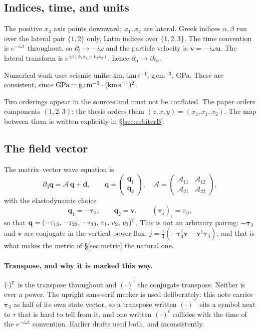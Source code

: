 \documentclass[11pt,a4paper]{article}
\newcommand{\bq}{\mathbf{q}}
\newcommand{\bd}{\mathbf{d}}
\newcommand{\bv}{\mathbf{v}}
\newcommand{\bu}{\mathbf{u}}
\newcommand{\bta}{\boldsymbol{\tau}}
\newcommand{\Aop}{\mathcal{A}}
\newcommand{\tp}{^{\mkern-1.5mu\mathsf{T}}}
\begin{document}
\subsection{Indices, time, and units}

The positive $x_3$ axis points downward; $x_1,x_2$ are lateral.  Greek indices
$\alpha,\beta$ run over the lateral pair $\{1,2\}$ only, Latin indices over
$\{1,2,3\}$.  The time convention is $e^{-i\omega t}$ throughout, so
$\partial_t \to -i\omega$ and the particle velocity is $\bv = -i\omega\bu$.  The
lateral transform is $e^{+i(k_1x_1+k_2x_2)}$, hence $\partial_\alpha \to
ik_\alpha$.

Numerical work uses seismic units: km, km\,s$^{-1}$, g\,cm$^{-3}$, GPa.  These
are consistent, since $\text{GPa} = \text{g\,cm}^{-3}\cdot(\text{km\,s}^{-1})^2$.

Two orderings appear in the sources and must not be conflated.  The paper orders
components $(1,2,3)$; the thesis orders them $(z,x,y) = (x_3,x_1,x_2)$.  The map
between them is written explicitly in \S\ref{sec:arbiterB}.

\subsection{The field vector}

The matrix--vector wave equation is
\begin{equation}\label{eq:mvwe}
  \partial_3\bq = \Aop\,\bq + \bd,
  \qquad
  \bq = \begin{pmatrix}\bq_1\\ \bq_2\end{pmatrix},
  \quad
  \Aop = \begin{pmatrix}\Aop_{11} & \Aop_{12}\\ \Aop_{21} & \Aop_{22}\end{pmatrix},
\end{equation}
with the elastodynamic choice
\begin{equation}\label{eq:qdef}
  \bq_1 = -\bta_3, \qquad \bq_2 = \bv,
  \qquad (\bta_j)_i = \tau_{ij},
\end{equation}
so that $\bq = (-\tau_{13},\,-\tau_{23},\,-\tau_{33},\,v_1,\,v_2,\,v_3)\tp$.
This is not an arbitrary pairing: $-\bta_3$ and $\bv$ are conjugate in the
vertical power flux, $j = \tfrac14(-\bta_3^{\dagger}\bv - \bv^{\dagger}\bta_3)$,
and that is what makes the metric of \S\ref{sec:metric} the natural one.

\paragraph{Transpose, and why it is marked this way.}  $(\cdot)\tp$ is the
transpose throughout and $(\cdot)^{\dagger}$ the conjugate transpose.  Neither
is ever a power.  The upright sans-serif marker is used deliberately: this note
carries $\bta_3$ as half of its own state vector, so a transpose written
$(\cdot)^{\top}$ sits a symbol next to $\tau$ that is hard to tell from it, and
one written $(\cdot)^{t}$ collides with the time of the $e^{-i\omega t}$
convention.  Earlier drafts used both, and inconsistently.
\end{document}
